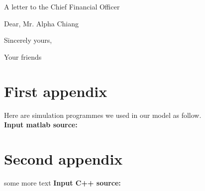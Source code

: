 \documentclass{mcmthesis}
\begin{document}



\newpage
\begin{center}
  A letter to the Chief Financial Officer
\end{center}
\begin{letter}{Dear, Mr. Alpha Chiang}

  \lipsum[1-2]

  \vspace{\parskip}

  Sincerely yours,

  Your friends

\end{letter}
\newpage
\begin{appendices}

  \section{First appendix}
  Here are simulation programmes we used in our model as follow.\\

  \textbf{\textcolor[rgb]{0.98,0.00,0.00}{Input matlab source:}}
  

  \section{Second appendix}

  some more text \textcolor[rgb]{0.98,0.00,0.00}{\textbf{Input C++ source:}}
  

\end{appendices}
\end{document}
